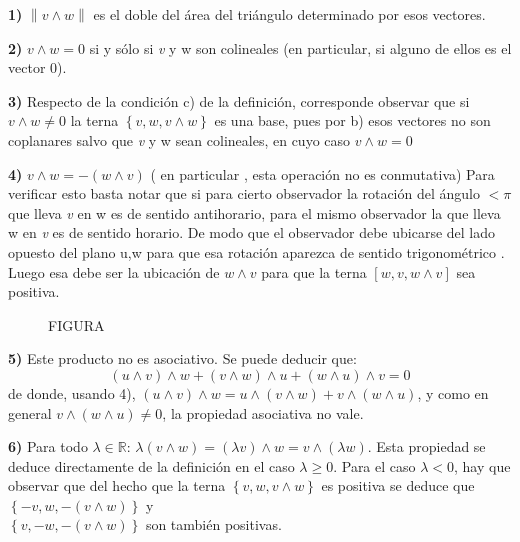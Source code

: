 \textbf{1)} $\left\| {v \wedge w} \right\|$ es el doble del
\'{a}rea del tri\'{a}ngulo determinado por esos vectores.


\textbf{2)} $v \wedge w = 0$ si y s\'{o}lo si \textit{v }y w son
colineales (en particular, si alguno de ellos es el vector $0$).


\textbf{3) }Respecto de la condici\'{o}n  c) de la definici\'{o}n,
corresponde observar que si $v \wedge w \ne 0$ la terna $\left\{
{v,w,v \wedge w} \right\}$ es una base, pues por b) esos vectores
no son coplanares salvo que \textit{v }y w sean colineales, en
cuyo caso $v \wedge w = 0$

\textbf{4) }$v \wedge w =  - \left( {w \wedge v} \right)$ ( en
particular , esta operaci\'{o}n no es conmutativa) Para verificar
esto basta notar que si para cierto observador la rotaci\'{o}n del
\'{a}ngulo $ < \pi $ que lleva \textit{v }en w es de sentido
antihorario, para el mismo observador la que lleva w en \textit{v
}es de sentido horario. De modo que el observador debe ubicarse
del lado opuesto del plano u,w para que esa rotaci\'{o}n aparezca
de sentido trigonom\'{e}trico . Luego esa debe ser la
ubicaci\'{o}n de $w \wedge v$ para que la terna $\left[ {w,v,w
\wedge v} \right]$ sea positiva.

\begin{figure}[htb]
\centering
FIGURA
\end{figure}
%
\textbf{5) }Este producto no es asociativo. Se puede deducir que:
\[
\left( {u \wedge v} \right) \wedge w + \left( {v \wedge w} \right)
\wedge u + \left( {w \wedge u} \right) \wedge v = 0
\] de donde, usando 4), $\left( {u \wedge v} \right) \wedge w = u
\wedge \left( {v \wedge w} \right) + v \wedge \left( {w \wedge u}
\right)$, y como en general $v \wedge \left( {w \wedge u} \right)
\ne 0$, la propiedad asociativa no vale.

\textbf{6) }Para todo $\lambda  \in \mathbb{R}$: $\lambda \left(
{v \wedge w} \right) = \left( {\lambda v} \right) \wedge w = v
\wedge \left( {\lambda w} \right)$. Esta propiedad se deduce
directamente de la definici\'{o}n en el caso $\lambda  \ge
0$. Para el caso $\lambda  < 0$, hay que observar que del hecho
que la terna $\left\{ {v,w,v \wedge w} \right\}$ es positiva se
deduce que $\left\{ { - v,w, - \left( {v \wedge w} \right)}
\right\} $ y
\\ $ \left\{ {v, - w, - \left( {v \wedge w} \right)} \right\}$ son
tambi\'{e}n positivas.

